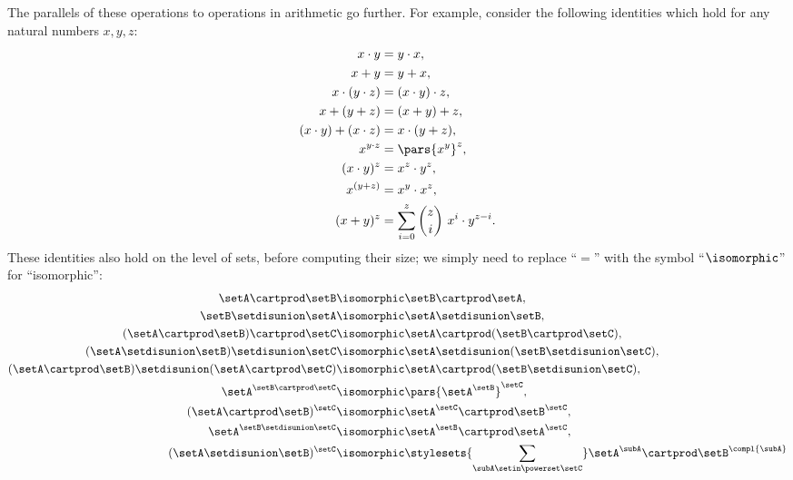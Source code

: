 The parallels of these operations to operations in arithmetic go further.
For example, consider the following identities which hold for any natural numbers $x, y, z$: 
\begin{align}
    x \cdot y & = y \cdot x,  \\ 
    x + y & = y + x, \\
    x \cdot (y \cdot z) & = (x \cdot y) \cdot z, \\
    x + (y + z) & = (x + y) + z, \\
    (x \cdot y) + (x \cdot z)  & = x \cdot (y + z), \\
    x^{y \cdot z}                    & = \pars{x^y}^z, \\
    (x \cdot y)^z &= x^z \cdot y^z, \\
    x^{(y + z)}           & = x^y \cdot x^z, \\
    (x + y)^z &= \sum_{i = 0}^z {{z}\choose{i}} \ x^i \cdot y^{z - i}. 
\end{align}
These identities also hold on the level of sets, before computing their size; we simply need to replace ``$=$'' with the symbol ``$\isomorphic$'' for ``isomorphic'':
\begin{align}
    \setA \cartprod \setB & \isomorphic \setB \cartprod \setA, \label{eq:commutativity-prod-sets} \\
    \setB \setdisunion \setA & \isomorphic \setA \setdisunion \setB, \label{eq:commutativity-sum-sets}  \\
    (\setA \cartprod \setB) \cartprod \setC & \isomorphic \setA \cartprod (\setB \cartprod \setC), \\
    (\setA \setdisunion \setB) \setdisunion \setC & \isomorphic \setA \setdisunion (\setB \setdisunion \setC), \\
    (\setA \cartprod \setB) \setdisunion (\setA \cartprod \setC)  & \isomorphic \setA \cartprod (\setB \setdisunion \setC), \\
    \setA^{\setB \cartprod \setC}                    & \isomorphic \pars{\setA^\setB}^\setC, \\
    (\setA \cartprod \setB)^{\setC} & \isomorphic  \setA^\setC \cartprod \setB^\setC, \\
    \setA^{\setB \setdisunion \setC}           & \isomorphic \setA^\setB \cartprod \setA^\setC, \\
    (\setA \setdisunion \setB)^{\setC} & \isomorphic \stylesets{\sum_{\subA \setin \powerset \setC}} \setA^\subA \cartprod \setB^{\compl{\subA}} \label{eq:binomial-theorem-sets}
\end{align}

